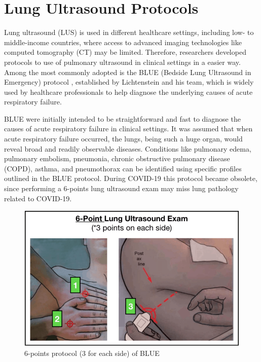 \newpage
\chapter{Lung Ultrasound Protocols}
Lung ultrasound (LUS) is used in different healthcare settings, including low- to middle-income countries, where access to advanced imaging technologies like computed tomography (CT) may be limited. Therefore, researchers developed protocols to use of pulmonary ultrasound in clinical settings in a easier way. Among the most commonly adopted is the BLUE (Bedside Lung Ultrasound in Emergency) protocol \cite{lichtenstein2008blue}, established by Lichtenstein and his team, which is widely used by healthcare professionals to help diagnose the underlying causes of acute respiratory failure.

BLUE were initially intended to be straightforward and fast to diagnose the causes of acute respiratory failure in clinical settings. It was assumed that when acute respiratory failure occurred, the lungs, being such a huge organ, would reveal broad and readily observable diseases. Conditions like pulmonary edema, pulmonary embolism, pneumonia, chronic obstructive pulmonary disease (COPD), asthma, and pneumothorax can be identified using specific profiles outlined in the BLUE protocol. During COVID-19 this protocol became obsolete, since performing a 6-points lung ultrasound exam may miss lung pathology related to COVID-19.
\begin{figure}[h]
    \centering
    \includegraphics[width=0.5\linewidth]{images/us_protocols/6-points-protocol.png}
    \caption{6-points protocol (3 for each side) of BLUE}
    \label{fig:enter-label}
\end{figure}

